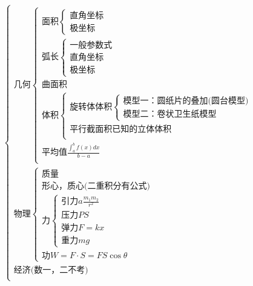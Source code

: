 \documentclass[a4paper,11pt]{book}
\begin{document}
\[
\text{\ }    
\begin{cases}
    \text{几何}
        \begin{cases}
            \text{面积}
                \begin{cases}
                    \text{直角坐标}\\
                    \text{极坐标}
                \end{cases}\\
            \text{弧长}
                \begin{cases}
                    \text{一般参数式}\\
                    \text{直角坐标}\\
                    \text{极坐标}
                \end{cases}\\
            \text{曲面积}\\
            \text{体积}
                \begin{cases}
                    \text{旋转体体积}
                        \begin{cases}
                            \text{模型一：圆纸片的叠加(圆台模型)}\\
                            \text{模型二：卷状卫生纸模型}
                        \end{cases}\\
                    \text{平行截面积已知的立体体积}\\
                \end{cases}\\
            \text{平均值}\frac{\int _{a}^{b}f(x)dx}{b-a}\\
        \end{cases}\\
    \text{物理}
        \begin{cases}
            \text{质量}\\
            \text{形心，质心(二重积分有公式)}\\
            \text{力}
                \begin{cases}
                    \text{引力}a\frac{m_{1}m_{2}}{r^{2}}\\
                    \text{压力}PS\\
                    \text{弹力}F=kx\\
                    \text{重力}mg
                \end{cases}\\
            \text{功}W=F·S=FS\cos \theta
        \end{cases}\\
    \text{经济(数一，二不考)}\\
\end{cases}
\]
\end{document}
